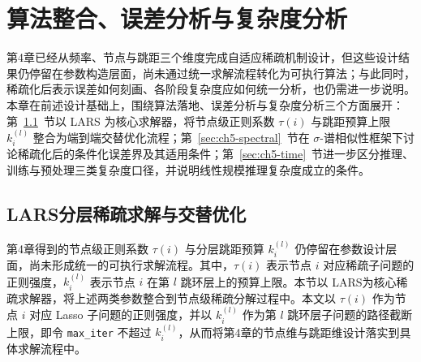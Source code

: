 
\chapter{算法整合、误差分析与复杂度分析}
\label{chap:algorithm-theory}

第4章已经从频率、节点与跳距三个维度完成自适应稀疏机制设计，但这些设计结果仍停留在参数构造层面，尚未通过统一求解流程转化为可执行算法；与此同时，稀疏化后表示误差如何刻画、各阶段复杂度应如何统一分析，也仍需进一步说明。本章在前述设计基础上，围绕算法落地、误差分析与复杂度分析三个方面展开：第~\ref{sec:ch5-lars}~节以 LARS 为核心求解器，将节点级正则系数 $\tau(i)$ 与跳距预算上限 $k_i^{(l)}$ 整合为端到端交替优化流程；第~\ref{sec:ch5-spectral}~节在 $\sigma$-谱相似性框架下讨论稀疏化后的条件化误差界及其适用条件；第~\ref{sec:ch5-time}~节进一步区分推理、训练与预处理三类复杂度口径，并说明线性规模推理复杂度成立的条件。



\section{LARS分层稀疏求解与交替优化}
\label{sec:ch5-lars}

第4章得到的节点级正则系数 $\tau(i)$ 与分层跳距预算 $k_i^{(l)}$ 仍停留在参数设计层面，尚未形成统一的可执行求解流程。其中，$\tau(i)$ 表示节点 $i$ 对应稀疏子问题的正则强度，$k_i^{(l)}$ 表示节点 $i$ 在第 $l$ 跳环层上的预算上限。本节以 LARS\cite{Efron2004LARS}为核心稀疏求解器，将上述两类参数整合到节点级稀疏分解过程中。本文以 $\tau(i)$ 作为节点 $i$ 对应 Lasso 子问题的正则强度，并以 $k_i^{(l)}$ 作为第 $l$ 跳环层子问题的路径截断上限，即令 \texttt{max\_iter} 不超过 $k_i^{(l)}$，从而将第4章的节点维与跳距维设计落实到具体求解流程中。

